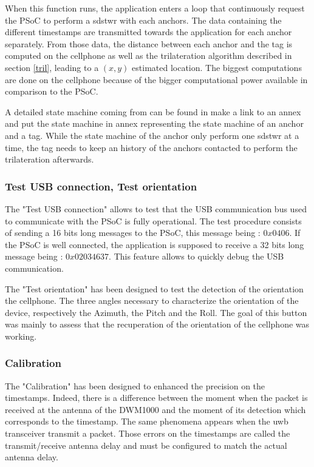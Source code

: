 When this function runs, the application enters a loop that continuously request the PSoC to perform a \gls{sdstwr} with each anchors. The data containing the different timestamps are transmitted towards the application for each anchor separately. From those data, the distance between each anchor and the tag is computed on the cellphone as well as the trilateration algorithm described in section \ref{tril}, leading to a $(x, y)$ estimated location. The biggest computations are done on the cellphone because of the bigger computational power available in comparison to the PSoC.
\vspace{2mm}

A detailed state machine coming from \cite{hannotier2019indoor} can be found in \color{red} make a link to an annex and put the state machine in annex \color{black} representing the state machine of an anchor and a tag. While the state machine of the anchor only perform one \gls{sdstwr} at a time, the tag needs to keep an history of the anchors contacted to perform the trilateration afterwards.

\subsubsection{Test USB connection, Test orientation}

The "Test USB connection" allows to test that the USB communication bus used to communicate with the PSoC is fully operational. The test procedure consists of sending a 16 bits long messages to the PSoC, this message being : $0x0406$. If the PSoC is well connected, the application is supposed to receive a 32 bits long message being : $0x02034637$. This feature allows to quickly debug the USB communication.
\vspace{2mm}

The "Test orientation" has been designed to test the detection of the orientation the cellphone. The three angles necessary to characterize the orientation of the device, respectively the Azimuth, the Pitch and the Roll. The goal of this button was mainly to assess that the recuperation of the orientation of the cellphone was working.

\subsubsection{Calibration}

The "Calibration" has been designed to enhanced the precision on the timestamps. Indeed, there is a difference between the moment when the packet is received at the antenna of the DWM1000 and the moment of its detection which corresponds to the timestamp. The same phenomena appears when the \gls{uwb} transceiver transmit a packet. Those errors on the timestamps are called the transmit/receive antenna delay and must be configured to match the actual antenna delay.

